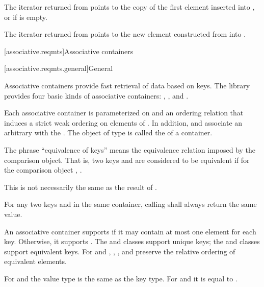 \documentclass{wg21}
\begin{document}
\pnum
The iterator returned from  points to the copy of the first
element inserted into , or  if  is empty.

\pnum
The iterator returned from  points to the new element
constructed from  into .



[associative.reqmts]{Associative containers}

[associative.reqmts.general]{General}

\pnum
Associative containers provide fast retrieval of data based on keys.
The library provides four basic kinds of associative containers:
,
,
and
.

\pnum
Each associative container is parameterized on
and an ordering relation
that induces a strict weak ordering on
elements of
.
In addition,
and
associate an arbitrary 
with the
.
The object of type
is called the
of a container.

\pnum
The phrase ``equivalence of keys'' means the equivalence relation imposed by the
comparison object.
That is, two keys
and
are considered to be equivalent if for the
comparison object
,
.
\begin{note}
    This is not necessarily the same as the result of .
\end{note}
For any two keys
and
in the same container, calling
shall always return the same value.

\pnum
An associative container supports  if it may contain at
most one element for each key. Otherwise, it supports .
The  and  classes support unique keys; the 
and  classes support equivalent keys.
For  and ,
, , and  preserve the relative ordering
of equivalent elements.

\pnum
For  and  the value type is the same as the key type.
For  and  it is equal to .
\end{document}
